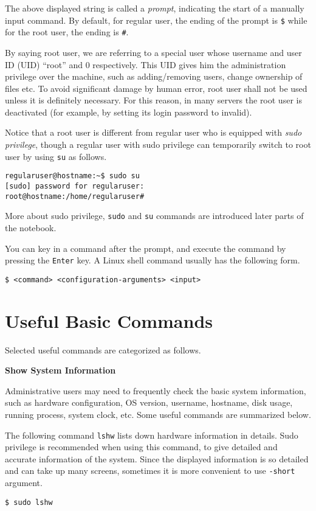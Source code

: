 The above displayed string is called a \textit{prompt}, indicating the start of a manually input command. By default, for regular user, the ending of the prompt is \verb|$| while for the root user, the ending is \verb|#|.

By saying root user, we are referring to a special user whose username and user ID (UID) ``root'' and $0$ respectively. This UID gives him the administration privilege over the machine, such as adding/removing users, change ownership of files etc. To avoid significant damage by human error, root user shall not be used unless it is definitely necessary. For this reason, in many servers the root user is deactivated (for example, by setting its login password to invalid).

Notice that a root user is different from regular user who is equipped with \textit{sudo privilege}, though a regular user with sudo privilege can temporarily switch to root user by using \verb|su| as follows.
\begin{verbatim}
regularuser@hostname:~$ sudo su
[sudo] password for regularuser:
root@hostname:/home/regularuser#
\end{verbatim}

More about sudo privilege, \verb|sudo| and \verb|su| commands are introduced later parts of the notebook.

You can key in a command after the prompt, and execute the command by pressing the \verb|Enter| key. A Linux shell command usually has the following form.
\begin{verbatim}
$ <command> <configuration-arguments> <input>
\end{verbatim}


\section{Useful Basic Commands}

Selected useful commands are categorized as follows.

\vspace{0.1in}
\noindent \textbf{Show System Information}
\vspace{0.1in}

Administrative users may need to frequently check the basic system information, such as hardware configuration, OS version, username, hostname, disk usage, running process, system clock, etc. Some useful commands are summarized below.

The following command \verb|lshw| lists down hardware information in details. Sudo privilege is recommended when using this command, to give detailed and accurate information of the system. Since the displayed information is so detailed and can take up many screens, sometimes it is more convenient to use \verb|-short| argument.
\begin{verbatim}
$ sudo lshw
\end{verbatim}



